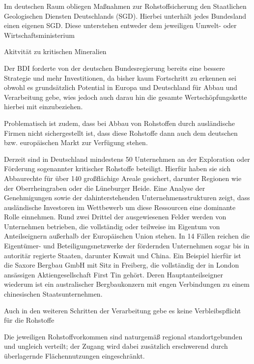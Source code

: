 \documentclass[12pt,a4paper,oneside]{book} %
\begin{document}
Im deutschen Raum obliegen Maßnahmen zur Rohstoffsicherung den Staatlichen Geologischen Diensten Deutschlands (SGD). Hierbei unterhält jedes Bundesland einen eigenen SGD. Diese unterstehen entweder dem jeweiligen Umwelt- oder Wirtschaftsministerium

Akitvität zu kritischen Mineralien

Der BDI forderte von der deutschen Bundesregierung bereits eine bessere Strategie und mehr Investitionen, da bisher kaum Fortschritt zu erkennen sei obwohl es grundsätzlich Potential in Europa und Deutschland  für Abbau und Verarbeitung gebe, wies jedoch auch darau hin die gesamte Wertschöpfungskette hierbei mit einzubeziehen.\autocite{Industrie: Rohstoffpolitik der Regierung ist zu zögerlich, Leipziger Volkszeitung - Leipzig vom 14.02.2026, Seite 4}

Problematisch ist zudem, dass bei Abbau von Rohstoffen durch ausländische Firmen nicht sichergestellt ist, dass diese Rohstoffe dann auch dem deutschen bzw. europäischen Markt zur Verfügung stehen.\autocite{DIW-Chef Fratzscher: Deutschland braucht Vetorecht bei der Ausfuhr kritischer Rohstoffe}

Derzeit sind in Deutschland mindestens 50 Unternehmen an der Exploration oder Förderung sogenannter kritischer Rohstoffe beteiligt. Hierfür haben sie sich Abbaurechte für über 140 großflächige Areale gesichert, darunter Regionen wie der Oberrheingraben oder die Lüneburger Heide. Eine Analyse der Genehmigungen sowie der dahinterstehenden Unternehmensstrukturen zeigt, dass ausländische Investoren im Wettbewerb um diese Ressourcen eine dominante Rolle einnehmen. Rund zwei Drittel der ausgewiesenen Felder werden von Unternehmen betrieben, die vollständig oder teilweise im Eigentum von Anteilseignern außerhalb der Europäischen Union stehen. In 14 Fällen reichen die Eigentümer- und Beteiligungsnetzwerke der fördernden Unternehmen sogar bis in autoritär regierte Staaten, darunter Kuwait und China. Ein Beispiel hierfür ist die Saxore Bergbau GmbH mit Sitz in Freiberg, die vollständig der in London ansässigen Aktiengesellschaft First Tin gehört. Deren Hauptanteilseigner wiederum ist ein australischer Bergbaukonzern mit engen Verbindungen zu einem chinesischen Staatsunternehmen.\autocite{Wie Deutschland die Kontrolle über seine wichtigsten Rohstoffe verspielt, RND. 12.02.2026}

Auch in den weiteren Schritten der Verarbeitung gebe es keine Verbleibspflicht für die Rohstoffe

Die jeweiligen Rohstoffvorkommen sind naturgemäß regional standortgebunden und ungleich verteilt; der Zugang wird dabei zusätzlich erschwerend durch überlagernde Flächennutzungen eingeschränkt.\autocite{Bericht zur Rohstoffsituation in Deutschland 2023, S. 17}
\end{document}
